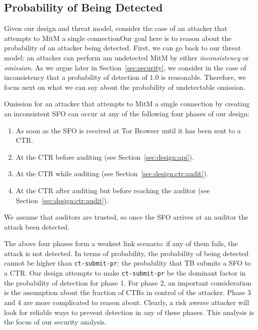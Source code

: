 \subsection{Probability of Being Detected}
Given our design and threat model, consider the case of an attacker that
attempts to MitM a single connectionOur goal here is to reason about the
probability of an attacker being detected. First, we can go back to our threat
model: an attacker can perform am undetected MitM by either \emph{inconsistency}
or \emph{omission}. As we argue later in Section~\ref{sec:security}, we consider
in the case of inconsistency that a probability of detection of $1.0$ is
reasonable. Therefore, we focus next on what we can say about the probability of
undetectable omission.

Omission for an attacker that attempts to MitM a single connection by creating
an inconsistent SFO can occur at any of the following four phases of our design:
\begin{enumerate}
    \item As soon as the SFO is received at Tor Browser until it has been sent
    to a CTR.
    \item At the CTR before auditing (see Section~\ref{sec:design:api}).
    \item At the CTR while auditing (see Section~\ref{sec:design:ctr:audit}).
    \item At the CTR after auditing but before reaching the auditor (see
    Section~\ref{sec:design:ctr:audit}).
\end{enumerate}

We assume that auditors are trusted, so once the SFO arrives at an auditor the
attack been detected. 

The above four phases form a weakest link scenario: if any of them fails, the
attack is not detected. In terms of probability, the probability of being
detected cannot be higher than \texttt{ct-submit-pr}; the probability that TB
submits a SFO to a CTR. Our design attempts to make \texttt{ct-submit-pr} be the
dominant factor in the probability of detection for phase 1. For phase 2, an
important consideration is the assumption about the fraction of CTRs in control
of the attacker. Phase 3 and 4 are more complicated to reason about. Clearly, a
risk awerse attacker will look for reliable ways to prevent detection in any of
these phases. This analysis is the focus of our security analysis.